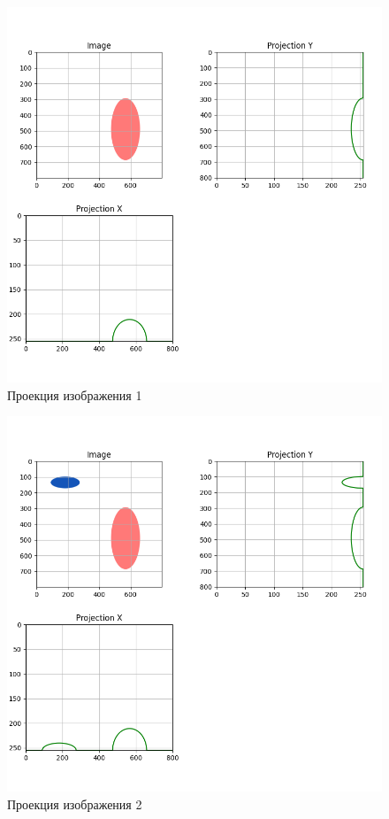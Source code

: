 \begin{figure}[H]
    \centering
    \includegraphics[width=\textwidth]{../results/Projection 1.png}
    \caption{Проекция изображения 1}
    \label{fig:projection1}
\end{figure}

\begin{figure}[H]
    \centering
    \includegraphics[width=\textwidth]{../results/Projection 2.png}
    \caption{Проекция изображения 2}
    \label{fig:projection2}
\end{figure}

